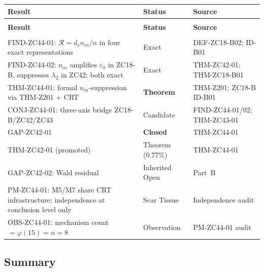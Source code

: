 \documentclass[12pt, a4paper]{article}
\providecommand{\eps}{\varepsilon_0}
\providecommand{\ltwo}{\lambda_2}
\providecommand{\nm}{n_m}
\providecommand{\ds}{d_s}
\providecommand{\phitot}{\varphi}
\providecommand{\Rcal}{\mathcal{R}}
\begin{document}
{\small
\setlength{\LTpre}{4pt}\setlength{\LTpost}{4pt}
\renewcommand{\arraystretch}{1.30}
\begin{longtable}{>{\raggedright\arraybackslash}p{5.5cm}
                  >{\centering\arraybackslash}p{2.8cm}
                  >{\raggedright\arraybackslash}p{4.0cm}}
\toprule
\textbf{Result} & \textbf{Status} & \textbf{Source} \\
\midrule
\endfirsthead
\multicolumn{3}{l}{\small\textit{(continued)}}\\[4pt]
\toprule
\textbf{Result} & \textbf{Status} & \textbf{Source} \\
\midrule
\endhead
\midrule
\multicolumn{3}{r}{\small\textit{(continues)}}\\
\endfoot
\bottomrule
\endlastfoot

FIND-ZC44-01: $\Rcal = \ds\nm/n$ in four
  exact representations &
  Exact & DEF-ZC18-B02; ID-B01 \\

FIND-ZC44-02: $\nm$ amplifies $\eps$ in ZC18-B,
  suppresses $\ltwo$ in ZC42; both exact &
  Exact & THM-ZC42-01; THM-ZC18-B01 \\

THM-ZC44-01: formal $\nm$-suppression via
  THM-Z201 + CRT &
  \textbf{Theorem} & THM-Z201; ZC18-B ID-B01 \\

CONJ-ZC44-01: three-axis bridge ZC18-B/ZC42/ZC43 &
  Candidate & FIND-ZC44-01/02; THM-ZC43-01 \\

GAP-ZC42-01 &
  \textbf{Closed} & THM-ZC44-01 \\

THM-ZC42-01 (promoted) &
  Theorem (0.77\%) & THM-ZC44-01 \\

GAP-ZC42-02: Wald residual &
  Inherited Open & Part~B \\

PM-ZC44-01: M5/M7 share CRT infrastructure;
  independence at conclusion level only &
  Scar Tissue & Independence audit \\

OBS-ZC44-01: mechanism count $= \phitot(15) = n = 8$ &
  Observation & PM-ZC44-01 audit \\

\end{longtable}
}
\vspace{-\parskip}

\subsection{Summary}
\end{document}
